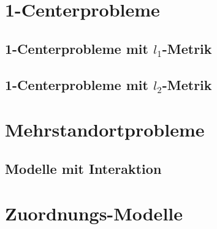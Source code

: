 
    \section{1-Centerprobleme} %
    \label{sec:1_centerprobleme}

      \subsection{1-Centerprobleme mit $l_1$-Metrik} %
      \label{sub:1_centerprobleme_mit_l_1_metrik}
      

      \subsection{1-Centerprobleme mit $l_2$-Metrik} %
      \label{sub:1_centerprobleme_mit_l_2_metrik}
      

    

    \section{Mehrstandortprobleme} %
    \label{sec:mehrstandortprobleme}
    
      \subsection{Modelle mit Interaktion} %
      \label{sub:modelle_mit_interaktion}
      

      \section{Zuordnungs-Modelle} %
      \label{sub:zuordnungs_modelle}
      






